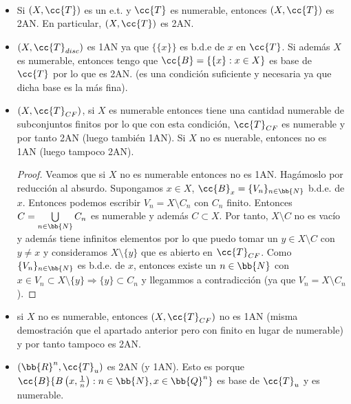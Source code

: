 \begin{ejemplo}\
    \begin{itemize}
        \item Si $(X, \cc{T})$ es un e.t. y $\cc{T}$ es numerable, entonces $(X, \cc{T})$ es 2AN. En particular, $(X, \cc{T})$ es 2AN.
        \item $(X, \cc{T}_{disc})$ es 1AN ya que $\{\{x\}\}$ es b.d.e de $x$ en $\cc{T}$. Si además $X$ es numerable, entonces tengo que $\cc{B}=\{\{x\}:x\in X\}$ es base de $\cc{T}$ por lo que es 2AN. (es una condición suficiente y necesaria ya que dicha base es la más fina).
        \item $(X, \cc{T}_{CF})$, si $X$ es numerable entonces tiene una cantidad numerable de subconjuntos finitos por lo que con esta condición, $\cc{T}_{CF}$ es numerable y por tanto 2AN (luego también 1AN). Si $X$ no es nuerable, entonces no es 1AN (luego tampoco 2AN).
        
        \begin{proof}
            Veamos que si $X$ no es numerable entonces no es 1AN. Hagámoslo por reducción al absurdo. Supongamos $x \in X$, $\cc{B}_x=\{V_n\}_{n\in \bb{N}}$ b.d.e. de $x$. Entonces podemos escribir $V_n = X \setminus C_n$ con $C_n$ finito. Entonces $C=\bigcup\limits_{n\in \bb{N}}C_n$ es numerable y además $C\subset X$. Por tanto, $X\setminus C$ no es vacío y además tiene infinitos elementos por lo que puedo tomar un $y\in X\setminus C$ con $y\neq x$ y consideramos $X\setminus\{y\}$ que es abierto en $\cc{T}_{CF}$. Como $\{V_n\}_{n\in \bb{N}}$ es b.d.e. de $x$, entonces existe un $n\in \bb{N}$ con $x\in V_n\subset X\setminus \{y\}\Rightarrow \{y\}\subset C_n$ y llegammos a contradicción (ya que $V_n = X\setminus C_n$).
        \end{proof}
        \item si $X$ no es numerable, entonces $(X, \cc{T}_{CF})$ no es 1AN (misma demostración que el apartado anterior pero con finito en lugar de numerable) y por tanto tampoco es 2AN.
        
        \item $(\bb{R}^n, \cc{T}_u)$ es 2AN (y 1AN). Esto es porque $\cc{B}\{B\left(x, \frac{1}{n}\right) : n\in \bb{N}, x \in \bb{Q}^n\}$ es base de $\cc{T}_u$ y es numerable.
    \end{itemize}
    \endsquare
\end{ejemplo}

